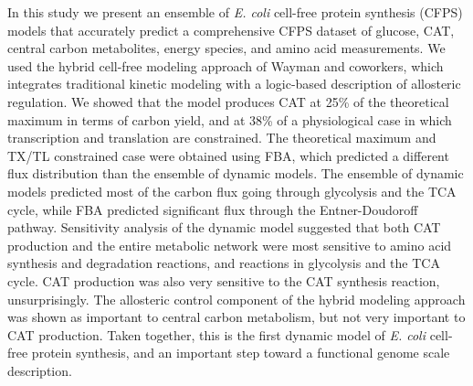 \documentclass[12pt]{article}
\begin{document}
In this study we present an ensemble of \textit{E. coli} cell-free protein synthesis (CFPS) models that accurately predict a comprehensive CFPS dataset of glucose, CAT, central carbon metabolites, energy species, and amino acid measurements.
We used the hybrid cell-free modeling approach of Wayman and coworkers, which integrates traditional kinetic modeling with a logic-based description of allosteric regulation.
We showed that the model produces CAT at 25\% of the theoretical maximum in terms of carbon yield, and at 38\% of a physiological case in which transcription and translation are constrained.
The theoretical maximum and TX/TL constrained case were obtained using FBA, which predicted a different flux distribution than the ensemble of dynamic models.
The ensemble of dynamic models predicted most of the carbon flux going through glycolysis and the TCA cycle, while FBA predicted significant flux through the Entner-Doudoroff pathway.
Sensitivity analysis of the dynamic model suggested that both CAT production and the entire metabolic network were most sensitive to amino acid synthesis and degradation reactions, and reactions in glycolysis and the TCA cycle.
CAT production was also very sensitive to the CAT synthesis reaction, unsurprisingly.
The allosteric control component of the hybrid modeling approach was shown as important to central carbon metabolism, but not very important to CAT production.
Taken together, this is the first dynamic model of \textit{E. coli} cell-free protein synthesis, and an important step toward a functional genome scale description.
\end{document}
